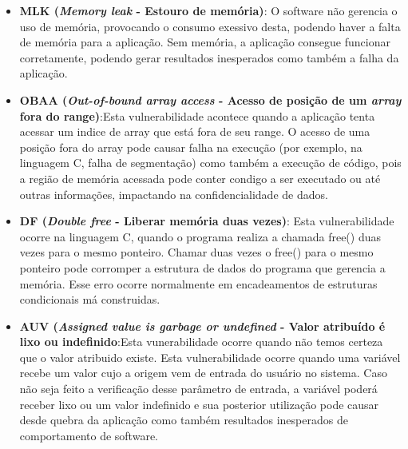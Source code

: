 \begin{itemize}
\item \textbf{MLK (\emph{Memory leak } - Estouro de memória)}: O software não gerencia o uso de memória, provocando o consumo exessivo desta, podendo haver a falta de memória para a aplicação. Sem memória, a aplicação consegue funcionar corretamente, podendo gerar resultados inesperados como também a falha da aplicação.

%

\item \textbf{OBAA (\emph{Out-of-bound array access } - Acesso de posição de um \emph{array} fora do range)}:Esta vulnerabilidade acontece quando a aplicação tenta acessar um indice de array que está fora de seu range. O acesso de uma posição fora do array pode causar falha na execução (por exemplo, na linguagem C, falha de segmentação) como também a execução de código, pois a região de memória acessada pode conter condigo a ser executado ou até outras informações, impactando na confidencialidade de dados.

%

\item \textbf{DF (\emph{Double free } - Liberar memória duas vezes)}: Esta vulnerabilidade ocorre na linguagem C, quando o programa realiza a chamada free() duas vezes para o mesmo ponteiro. Chamar duas vezes o free() para o mesmo ponteiro pode corromper a estrutura de dados do programa que gerencia a memória. Esse erro ocorre normalmente em encadeamentos de estruturas condicionais má construidas.

\item \textbf{AUV (\emph{Assigned value is garbage or undefined} - Valor atribuído é lixo ou indefinido}:Esta vunerabilidade ocorre quando não temos certeza que o valor atribuido existe. Esta vulnerabilidade ocorre quando uma variável recebe um valor cujo a origem vem de entrada do usuário no sistema. Caso não seja feito a verificação desse parâmetro de entrada, a variável poderá receber lixo ou um valor indefinido e sua posterior utilização pode causar desde quebra da aplicação como também resultados inesperados de comportamento de software.

\end{itemize}

%

